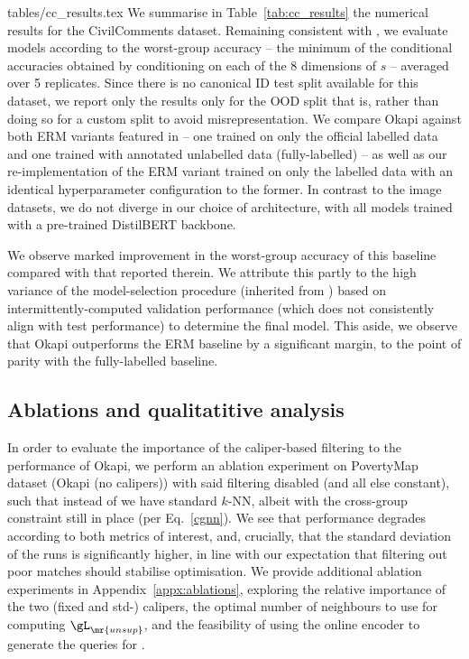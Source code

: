 {tables/cc_results.tex}
We summarise in Table~\ref{tab:cc_results} the numerical results for the CivilComments dataset.
Remaining consistent with \cite{SagWeiLeeGaoetal22}, we evaluate models according to the
worst-group accuracy -- the minimum of the conditional accuracies obtained by conditioning on each
of the 8 dimensions of $s$ -- averaged over 5 replicates. Since there is no canonical ID test split
available for this dataset, we report only the results only for the OOD split that is, rather than
doing so for a custom split to avoid misrepresentation. We compare Okapi against both ERM variants
featured in \cite{SagWeiLeeGaoetal22} -- one trained on only the official labelled data and one
trained with annotated unlabelled data (fully-labelled) -- as well as our re-implementation of the
ERM variant trained on only the labelled data with an identical hyperparameter configuration to the
former. In contrast to the image datasets, we do not diverge in our choice of architecture, with
all models trained with a pre-trained DistilBERT \citep{sanh2019distilbert} backbone.

We observe marked improvement in the worst-group accuracy of this baseline compared with that
reported therein. We attribute this partly to the high variance of the model-selection procedure
(inherited from \cite{SagWeiLeeGaoetal22}) based on intermittently-computed validation performance
(which does not consistently align with test performance) to determine the final model. This aside,
we observe that Okapi outperforms the ERM baseline by a significant margin, to the point of parity
with the fully-labelled baseline.

\subsection{Ablations and qualitatitive analysis}


In order to evaluate the importance of the caliper-based filtering to the performance of Okapi, we
perform an ablation experiment on PovertyMap dataset (Okapi (no calipers)) with said filtering
disabled (and all else constant), such that instead of \CNN{} we have standard $k$-NN, albeit with
the cross-group constraint still in place (per Eq.~\ref{cgnn}).
%
We see that performance degrades according to both metrics of interest, and, crucially, that the
standard deviation of the runs is significantly higher, in line with our expectation that filtering
out poor matches should stabilise optimisation.
%
We provide additional ablation experiments in Appendix~\ref{appx:ablations}, exploring the relative
importance of the two (fixed and std-) calipers, the optimal number of neighbours to use for
computing $\gL_\mr{unsup}$, and the feasibility of using the online encoder to generate the
queries for \CNN{}.

